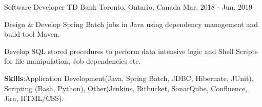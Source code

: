 \begin{cventries}
  \cventry
    {Software Developer} %
    {TD Bank} %
    {Toronto, Ontario, Canada} %
    {Mar. 2018 - Jun. 2019} %
    {
      \begin{cvitems} %
        \item {Design \& Develop Spring Batch jobs in Java using dependency management and build tool Maven.}
        \item {Develop SQL stored procedures to perform data intensive logic and Shell Scripts for file manipulation, Job dependencies etc. }
        \item {\textbf{Skills}:Application Development(Java, Spring Batch, JDBC, Hibernate, JUnit), Scripting (Bash, Python), Other(Jenkins, Bitbucket, SonarQube, Confluence, Jira, HTML/CSS).}
      \end{cvitems}
    }

\end{cventries}